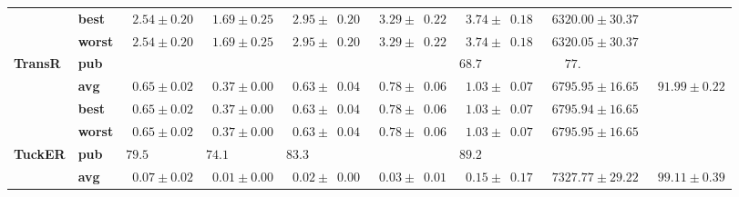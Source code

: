 \begin{tabular}{llrrrrrrr}
       & \textbf{best} &  $\phantom{0}2.54 \pm 0.20$ &  $\phantom{0}1.69 \pm 0.25$ &  $\phantom{0}2.95 \pm \phantom{0}0.20$ &  $\phantom{0}3.29 \pm \phantom{0}0.22$ &  $\phantom{0}3.74 \pm \phantom{0}0.18$ &            $\phantom{0}6320.00 \pm 30.37$ &                              \\
       & \textbf{worst} &  $\phantom{0}2.54 \pm 0.20$ &  $\phantom{0}1.69 \pm 0.25$ &  $\phantom{0}2.95 \pm \phantom{0}0.20$ &  $\phantom{0}3.29 \pm \phantom{0}0.22$ &  $\phantom{0}3.74 \pm \phantom{0}0.18$ &            $\phantom{0}6320.05 \pm 30.37$ &                              \\
\textbf{TransR} & \textbf{pub} &                             &                             &                                        &                                        &            $68.7\phantom{0 \pm 00.00}$ &  $\phantom{000}77.\phantom{00 \pm 00.00}$ &                              \\
       & \textbf{avg} &  $\phantom{0}0.65 \pm 0.02$ &  $\phantom{0}0.37 \pm 0.00$ &  $\phantom{0}0.63 \pm \phantom{0}0.04$ &  $\phantom{0}0.78 \pm \phantom{0}0.06$ &  $\phantom{0}1.03 \pm \phantom{0}0.07$ &            $\phantom{0}6795.95 \pm 16.65$ &  $\phantom{0}91.99 \pm 0.22$ \\
       & \textbf{best} &  $\phantom{0}0.65 \pm 0.02$ &  $\phantom{0}0.37 \pm 0.00$ &  $\phantom{0}0.63 \pm \phantom{0}0.04$ &  $\phantom{0}0.78 \pm \phantom{0}0.06$ &  $\phantom{0}1.03 \pm \phantom{0}0.07$ &            $\phantom{0}6795.94 \pm 16.65$ &                              \\
       & \textbf{worst} &  $\phantom{0}0.65 \pm 0.02$ &  $\phantom{0}0.37 \pm 0.00$ &  $\phantom{0}0.63 \pm \phantom{0}0.04$ &  $\phantom{0}0.78 \pm \phantom{0}0.06$ &  $\phantom{0}1.03 \pm \phantom{0}0.07$ &            $\phantom{0}6795.95 \pm 16.65$ &                              \\
\textbf{TuckER} & \textbf{pub} &  $79.5\phantom{0 \pm 0.00}$ &  $74.1\phantom{0 \pm 0.00}$ &            $83.3\phantom{0 \pm 00.00}$ &                                        &            $89.2\phantom{0 \pm 00.00}$ &                                           &                              \\
       & \textbf{avg} &  $\phantom{0}0.07 \pm 0.02$ &  $\phantom{0}0.01 \pm 0.00$ &  $\phantom{0}0.02 \pm \phantom{0}0.00$ &  $\phantom{0}0.03 \pm \phantom{0}0.01$ &  $\phantom{0}0.15 \pm \phantom{0}0.17$ &            $\phantom{0}7327.77 \pm 29.22$ &  $\phantom{0}99.11 \pm 0.39$ \\
\bottomrule
\end{tabular}


